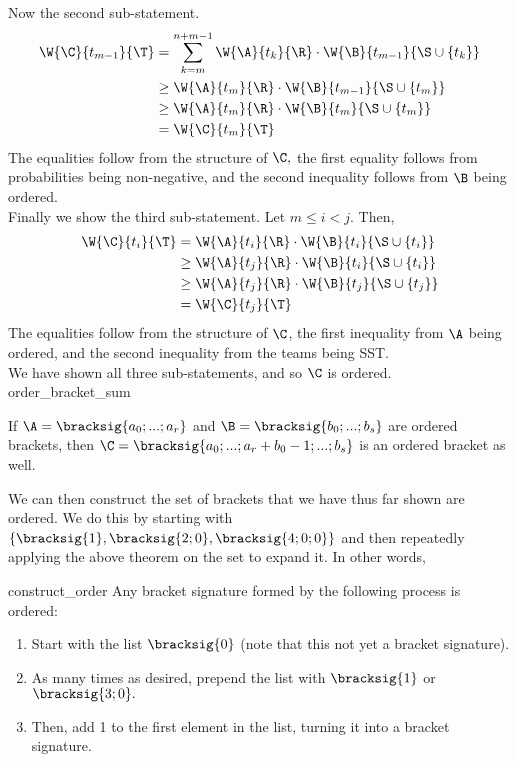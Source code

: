 {{Now the second sub-statement.
\begin{align*}
    \W{\C}{t_{m-1}}{\T} &= \sum_{k=m}^{n+m-1} \W{\A}{t_k}{\R} \cdot \W{\B}{t_{m-1}}{\S \cup \{t_k\}}\\
    &\geq \W{\A}{t_m}{\R} \cdot \W{\B}{t_{m-1}}{\S \cup \{t_m\}}\\
    &\geq \W{\A}{t_m}{\R} \cdot \W{\B}{t_{m}}{\S \cup \{t_m\}}\\
    &= \W{\C}{t_{m}}{\T}
\end{align*}
The equalities follow from the structure of $\C,$ the first equality follows from probabilities being non-negative, and the second inequality follows from $\B$ being ordered.\\

Finally we show the third sub-statement. Let $m \leq i < j.$ Then,
\begin{align*}
    \W{\C}{t_i}{\T} &= \W{\A}{t_i}{\R} \cdot \W{\B}{t_i}{\S \cup \{t_i\}}\\
    &\geq \W{\A}{t_j}{\R} \cdot \W{\B}{t_i}{\S \cup \{t_i\}}\\
    &\geq \W{\A}{t_j}{\R} \cdot \W{\B}{t_j}{\S \cup \{t_j\}}\\
    &= \W{\C}{t_j}{\T}
\end{align*}
The equalities follow from the structure of $\C$, the first inequality from $\A$ being ordered, and the second inequality from the teams being SST.\\

We have shown all three sub-statements, and so $\C$ is ordered.
}{order_bracket_sum}

\begin{corollary}{}{}
    If $\A = \bracksig{a_0; ...; a_r}$ and $\B = \bracksig{b_0; ...; b_s}$ are ordered brackets, then $\C = \bracksig{a_0; ...; a_r + b_0 - 1; ...; b_s}$ is an ordered bracket as well.
\end{corollary}

We can then construct the set of brackets that we have thus far shown are ordered. We do this by starting with $\{\bracksig{1}, \bracksig{2; 0}, \bracksig{4; 0; 0}\}$ and then repeatedly applying the above theorem on the set to expand it. In other words,

\begin{corollary}{}{construct_order}
    Any bracket signature formed by the following process is ordered:
    \begin{enumerate}
        \item Start with the list $\bracksig{0}$ (note that this not yet a bracket signature).
        \item As many times as desired, prepend the list with $\bracksig{1}$ or $\bracksig{3; 0}.$
        \item Then, add 1 to the first element in the list, turning it into a bracket signature.
    \end{enumerate}
\end{corollary}

}
